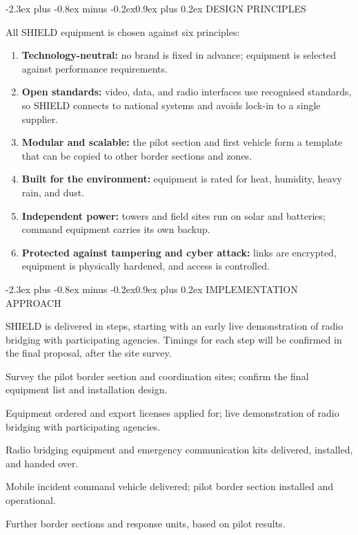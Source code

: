 \documentclass[10pt,letterpaper]{article}
\makeatletter
\renewcommand\section{\@startsection{section}{1}{0pt}%
  {-2.3ex plus -0.8ex minus -0.2ex}{0.9ex plus 0.2ex}%
  {\color{SDSSNavy}\large\bfseries}}
\newcommand{\EquipmentItem}[2]{\item[\textbf{#1}] #2}
\newcommand{\PrincipleItem}[2]{\item \textbf{#1:} #2}
\makeatother
\begin{document}
\clearpage
\section{DESIGN PRINCIPLES}
\thispagestyle{sdss}

All SHIELD equipment is chosen against six principles:

\begin{enumerate}[label=\alph*.,leftmargin=2em,itemsep=5pt]
  \PrincipleItem{Technology-neutral}{no brand is fixed in advance; equipment is selected against performance requirements.}
  \PrincipleItem{Open standards}{video, data, and radio interfaces use recognised standards, so SHIELD connects to national systems and avoids lock-in to a single supplier.}
  \PrincipleItem{Modular and scalable}{the pilot section and first vehicle form a template that can be copied to other border sections and zones.}
  \PrincipleItem{Built for the environment}{equipment is rated for heat, humidity, heavy rain, and dust.}
  \PrincipleItem{Independent power}{towers and field sites run on solar and batteries; command equipment carries its own backup.}
  \PrincipleItem{Protected against tampering and cyber attack}{links are encrypted, equipment is physically hardened, and access is controlled.}
\end{enumerate}

\section{IMPLEMENTATION APPROACH}

SHIELD is delivered in steps, starting with an early live demonstration of radio bridging with participating agencies. Timings for each step will be confirmed in the final proposal, after the site survey.

\begin{description}[style=nextline,leftmargin=0pt,labelsep=0pt,itemsep=7pt]
  \EquipmentItem{Step 0 - Site survey and design}{Survey the pilot border section and coordination sites; confirm the final equipment list and installation design.}
  \EquipmentItem{Step 1 - Launch and demonstration}{Equipment ordered and export licenses applied for; live demonstration of radio bridging with participating agencies.}
  \EquipmentItem{Step 2 - Interoperable communications}{Radio bridging equipment and emergency communication kits delivered, installed, and handed over.}
  \EquipmentItem{Step 3 - Incident command vehicle and border pilot}{Mobile incident command vehicle delivered; pilot border section installed and operational.}
  \EquipmentItem{Step 4 - Expansion}{Further border sections and response units, based on pilot results.}
\end{description}
\end{document}

